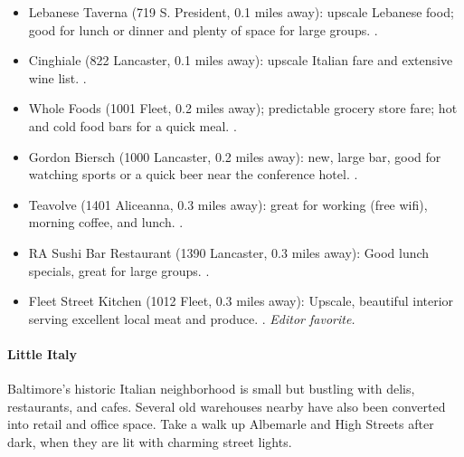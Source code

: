 \begin{itemize}
\item{Lebanese Taverna (719 S. President, 0.1 miles away): upscale Lebanese food; good for lunch or
  dinner and plenty of space for large groups. \professor.}
\item{Cinghiale (822 Lancaster, 0.1 miles away): upscale Italian fare and extensive wine list. \industry.}
\item{Whole Foods (1001 Fleet, 0.2 miles away); predictable grocery store fare; hot and cold food bars for a quick meal. \gradstudent.}
\item{Gordon Biersch (1000 Lancaster, 0.2 miles away): new, large bar, good for watching sports or a quick beer near the conference hotel. \postdoc.}
\item{Teavolve (1401 Aliceanna, 0.3 miles away): great for working (free wifi), morning coffee, and lunch. \gradstudent.}
\item{RA Sushi Bar Restaurant (1390 Lancaster, 0.3 miles away): Good lunch specials, great for large groups. \postdoc.} 
\item{Fleet Street Kitchen (1012 Fleet, 0.3 miles away): Upscale, beautiful interior serving excellent local meat and produce. \professor. \it{Editor favorite}.}
\end{itemize}

\paragraph*{Little Italy}
Baltimore's historic Italian neighborhood is small but bustling with delis, restaurants, and cafes. Several old warehouses nearby have also been converted into retail and office space. Take a walk up Albemarle and High Streets after dark, when they are lit with charming street lights.

